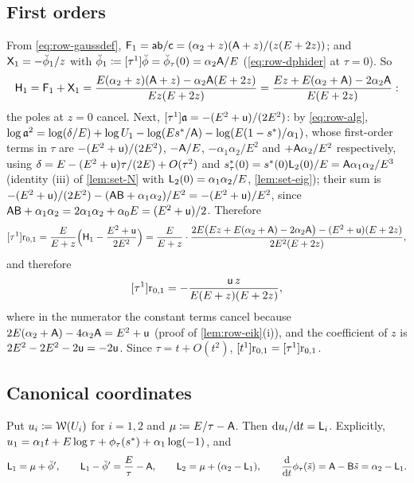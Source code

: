 \subsection{First orders}
\label{sec:row-first}

\begin{rmk}
\label{rmk:row-first}
From \eqref{eq:row-gaussdef}, $\mathsf{F}_1=\mathsf{a}\mathsf{b}/\mathsf{c}=(\alpha_2+z)(\mathsf{A}+z)/(z(E+2z))$; and $\mathsf{X}_1=-\breve{\phi}_1/z$ with $\breve{\phi}_1\coloneqq[\tau^1]\breve{\phi}=\breve{\phi}_\tau(0)=\alpha_2\mathsf{A}/E$ (\eqref{eq:row-dphider} at $\tau=0$). So
\[
\mathsf{H}_1=\mathsf{F}_1+\mathsf{X}_1=\frac{E(\alpha_2+z)(\mathsf{A}+z)-\alpha_2\mathsf{A}(E+2z)}{Ez(E+2z)}=\frac{Ez+E(\alpha_2+\mathsf{A})-2\alpha_2\mathsf{A}}{E(E+2z)}:
\]
the poles at $z=0$ cancel. Next, $[\tau^1]\mathfrak{a}=-(E^2+\mathsf{u})/(2E^2)$: by \eqref{eq:row-alg}, $\log\mathfrak{a}^2=\log(\delta/E)+\log U_1-\log(Es^{\ast}/\mathsf{A})-\log(E(1-s^{\ast})/\alpha_1)$, whose first-order terms in $\tau$ are $-(E^2+\mathsf{u})/(2E^2)$, $-\mathsf{A}/E$, $-\alpha_1\alpha_2/E^2$ and $+\mathsf{A}\alpha_2/E^2$ respectively, using $\delta=E-(E^2+\mathsf{u})\tau/(2E)+O(\tau^2)$ and $s^{\ast}_\tau(0)=s^{\ast}(0)\mathsf{L}_2(0)/E=\mathsf{A}\alpha_1\alpha_2/E^3$ (identity (iii) of \cref{lem:set-N} with $\mathsf{L}_2(0)=\alpha_1\alpha_2/E$, \cref{lem:set-eig}); their sum is $-(E^2+\mathsf{u})/(2E^2)-(\mathsf{A}\mathsf{B}+\alpha_1\alpha_2)/E^2=-(E^2+\mathsf{u})/E^2$, since $\mathsf{A}\mathsf{B}+\alpha_1\alpha_2=2\alpha_1\alpha_2+\alpha_0E=(E^2+\mathsf{u})/2$. Therefore
\[
[\tau^1]\mathrm{r}_{0,1}=\frac{E}{E+z}\Big(\mathsf{H}_1-\frac{E^2+\mathsf{u}}{2E^2}\Big)=\frac{E}{E+z}\cdot\frac{2E\big(Ez+E(\alpha_2+\mathsf{A})-2\alpha_2\mathsf{A}\big)-(E^2+\mathsf{u})(E+2z)}{2E^2(E+2z)},
\]
and therefore
\[
[\tau^1]\mathrm{r}_{0,1}=-\frac{\mathsf{u}\,z}{E(E+z)(E+2z)},
\]
where in the numerator the constant terms cancel because $2E(\alpha_2+\mathsf{A})-4\alpha_2\mathsf{A}=E^2+\mathsf{u}$ (proof of \cref{lem:row-eik}(i)), and the coefficient of $z$ is $2E^2-2E^2-2\mathsf{u}=-2\mathsf{u}$. Since $\tau=t+O(t^2)$, $[t^1]\mathrm{r}_{0,1}=[\tau^1]\mathrm{r}_{0,1}$.
\end{rmk}

\subsection{Canonical coordinates}
\label{sec:row-canon}

\begin{lem}
\label{lem:row-canon}
Put $u_i\coloneqq\mathcal{W}(U_i)$ for $i=1,2$ and $\mu\coloneqq E/\tau-\mathsf{A}$. Then $\mathrm{d} u_i/\mathrm{d} t=\mathsf{L}_i$. Explicitly, $u_1=\alpha_1t+E\log\tau+\phi_\tau(s^{\ast})+\alpha_1\log(-1)$, and
\[
\mathsf{L}_1=\mu+\breve{\phi}',\qquad \mathsf{L}_1-\breve{\phi}'=\frac E\tau-\mathsf{A},\qquad \mathsf{L}_2=\mu+(\alpha_2-\mathsf{L}_1),\qquad \frac{\mathrm{d}}{\mathrm{d} t}\phi_\tau(\tilde{s})=\mathsf{A}-\mathsf{B}\tilde{s}=\alpha_2-\mathsf{L}_1 .
\]
\end{lem}

